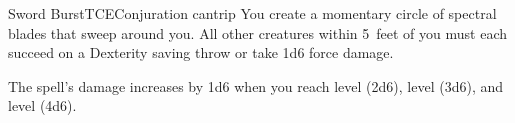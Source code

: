 \begin{spell}{Sword Burst}{TCE}{Conjuration cantrip}
{
}
You create a momentary circle of spectral blades that
sweep around you. All other creatures within 5~feet of
you must each succeed on a Dexterity saving throw or take
1d6 force damage.

 The spell's damage increases by
1d6 when you reach  level (2d6),  level (3d6),
and  level (4d6).
\end{spell}
